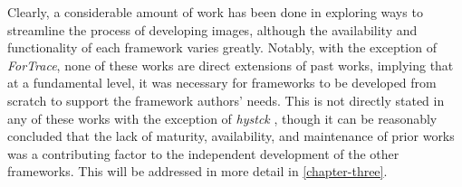 Clearly, a considerable amount of work has been done in exploring ways
to streamline the process of developing images, although the
availability and functionality of each framework varies greatly.
Notably, with the exception of \emph{ForTrace}, none of these works are
direct extensions of past works, implying that at a fundamental level,
it was necessary for frameworks to be developed from scratch to support
the framework authors' needs. This is not directly stated in any of
these works with the exception of \emph{hystck}
\cite{gobelNovelApproachGenerating2020}, though it can be reasonably
concluded that the lack of maturity, availability, and maintenance of
prior works was a contributing factor to the independent development of
the other frameworks. This will be addressed in more detail in
\autoref{chapter-three}.
